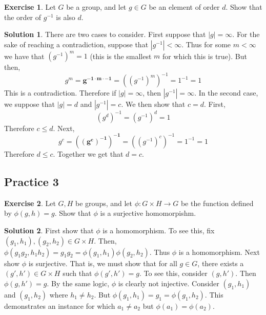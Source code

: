 \documentclass[12pt]{article}
\theoremstyle{definition}
\newtheorem{exercise}{\color{YellowOrange}Exercise}
\theoremstyle{definition}
\newtheorem{solution}{\color{Goldenrod}Solution}
\begin{document}
\begin{exercise}
Let $G$ be a group, and let $g \in G$ be an element of order $d$. Show that the order of $g^{-1}$ is also $d$.
\end{exercise}
\begin{solution}
There are two cases to consider. First suppose that $|g| = \infty$. For the sake of reaching a contradiction, suppose that $|g^{-1}| < \infty$. Thus for some $m < \infty$ we have that $(g^{-1})^m = 1$ (this is the smallest $m$ for which this is true). But then,
\begin{equation}
	g^m = \mathbf{g^{-1 \cdot m \cdot -1}} = ((g^{-1})^m)^{-1} = 1^{-1} = 1
\end{equation}
This is a contradiction. Therefore if $|g| = \infty$, then $|g^{-1}| = \infty$. In the second case, we suppose that $|g| = d$ and $|g^{-1}| = c$. We then show that $c=d$. First,
\begin{equation}
	(g^d)^{-1} = (g^{-1})^d = 1
\end{equation}
Therefore $c \leq d$. Next, 
\begin{equation}
	g^c = \mathbf{((g^c)^{-1})^{-1}} = ((g^{-1})^c)^{-1} = 1^{-1} = 1
\end{equation}
Therefore $d \leq c$. Together we get that $d = c$.
\end{solution}

\subsection{Practice 3}
\begin{exercise}
Let $G, H$ be groups, and let $\phi: G \times H \to G$ be the function defined by $\phi(g,h) = g$. Show that $\phi$ is a surjective homomorpishm. 
\end{exercise}
\begin{solution}
First show that $\phi$ is a homomorphism. To see this, fix $(g_1, h_1), (g_2, h_2) \in G \times H$. Then,
$\phi(g_1g_2, h_1h_2) = g_1 g_2 = \phi(g_1,h_1) \phi(g_2,h_2)$. Thus $\phi$ is a homomorphism. Next show $\phi$ is surjective. That is, we must show that for all $g \in G$, there exists a $(g', h') \in G \times H$ such that $\phi(g',h') = g$. To see this, consider $(g,h')$. Then $\phi(g,h') = g$. By the same logic, $\phi$ is clearly not injective. Consider $(g_1, h_1)$ and $(g_1, h_2)$ where $h_1 \neq h_2$. But $\phi(g_1,h_1) = g_1 = \phi(g_1, h_2)$. This demonstrates an instance for which $a_1 \neq a_2$ but $\phi(a_1) = \phi(a_2)$. 
\end{solution}
\end{document}
